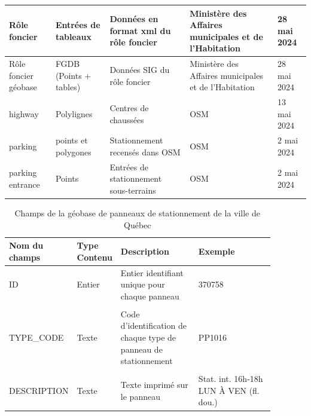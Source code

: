 \begin{landscape}
\begin{longtable}[h!]{p{.2 \linewidth} p{.1 \linewidth} p{.3 \linewidth} p{.15\linewidth} p{.125\linewidth} }
        \hline
        Rôle foncier & Entrées de tableaux & Données en format xml du rôle foncier & Ministère des Affaires municipales et de l'Habitation & 28 mai 2024 \\
        \hline
        Rôle foncier géobase & FGDB (Points + tables) & Données SIG du rôle foncier & Ministère des Affaires municipales et de l'Habitation & 28 mai 2024 \\
        \hline
        highway & Polylignes & Centres de chaussées & \ac{OSM} & 13 mai 2024\\
        \hline
        parking & points et polygones & Stationnement recensés dans \ac{OSM} & \ac{OSM} & 2 mai 2024 \\
        \hline
          parking entrance & Points & Entrées de stationnement sous-terrains  & \ac{OSM} & 2 mai 2024 \\
          \hline
        
      \end{longtable}

      \begin{table}[h!]
        \centering
        \begin{tabular}{p{0.18\linewidth} | p{0.1\linewidth} | p{0.3\linewidth} | p{0.3\linewidth}} 
        \hline
        Nom du champs & Type Contenu & Description  & Exemple\\ 
        \hline
        ID             & Entier    & Entier identifiant unique pour chaque panneau  & 370758 \\ 
        & & & \\
        TYPE\_CODE      & Texte     & Code d'identification de chaque type de panneau de stationnement & PP1016\\
        & & & \\
        DESCRIPTION     & Texte     & Texte imprimé sur le panneau & Stat. int. 16h-18h LUN À VEN (fl. dou.)\\
        \hline
        \end{tabular}
        \caption{Champs de la géobase de panneaux de stationnement de la ville de Québec \parencite{VilledeQuebec:PanneauxSignalisation:2024}}
        \label{tab:champs_geobase_stationnement_quebec}
      \end{table}
      \end{landscape}
